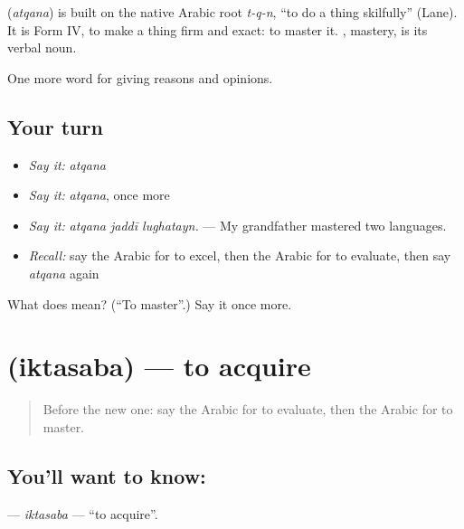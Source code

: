 \begin{cousinweb}
\textbf{} (\emph{atqana}) is built on the native Arabic root \emph{t-q-n}, \textquotedblleft{}to do a thing skilfully\textquotedblright{} (Lane). It is Form IV, to make a thing firm and exact: to master it. , mastery, is its verbal noun.
\end{cousinweb}

\begin{grammarlens}[title={What you've built}]
One more word for giving reasons and opinions.
\end{grammarlens}

\subsection*{Your turn}
\begin{itemize}
\raggedright
  \item \emph{Say it:} \emph{atqana}
  \item \emph{Say it:} \emph{atqana}, once more
  \item \emph{Say it:} \emph{atqana jaddī lughatayn.} — My grandfather mastered two languages.
  \item \emph{Recall:} say the Arabic for to excel, then the Arabic for to evaluate, then say \emph{atqana} again
\end{itemize}

\begin{tcolorbox}[breakable,colback=teal!4,colframe=teal!35!black,title={Before you move on}]
What does  mean? (\textquotedblleft{}To master\textquotedblright{}.) Say it once more.
\end{tcolorbox}
\section[\texorpdfstring{\ar{اكتسب} (iktasaba)}{اكتسب (iktasaba)}]{ (iktasaba) — to acquire}

\label{lesson:AR-C394-iktasaba}



\begin{quote}
Before the new one: say the Arabic for to evaluate, then the Arabic for to master.
\end{quote}

\subsection*{You'll want to know: }
\textbf{} — \emph{iktasaba} — \textquotedblleft{}to acquire\textquotedblright{}.

